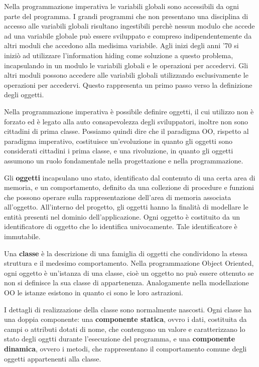 \documentclass[a4paper,18pt]{extarticle}
\begin{document}
Nella programmazione imperativa le variabili globali sono accessibili da ogni parte del programma. I grandi programmi che non presentano una disciplina di accesso alle variabili globali risultano ingestibili perchè nessun modulo che accede ad una variabile globale può essere sviluppato e compreso indipendentemente da altri moduli che accedono alla medisima variabile. Agli inizi degli anni '70 si iniziò ad utilizzare l'information hiding come soluzione a questo problema, incapsulando in un modulo le variabili globali e le operazioni per accedervi. Gli altri moduli possono accedere alle variabili globali utilizzando esclusivamente le operazioni per accedervi. Questo rappresenta un primo passo verso la definizione degli oggetti.

Nella programmazione imperativa è possibile definire oggetti, il cui utilizzo non è forzato ed è legato alla auto consapevolezza degli sviluppatori, inoltre non sono cittadini di prima classe. Possiamo quindi dire che il paradigma OO, rispetto al paradigma imperativo, costituisce un'evoluzione in quanto gli oggetti sono considerati cittadini i prima classe, e una rivoluzione, in quanto gli oggetti assumono un ruolo fondamentale nella progettazione e nella programmazione.

Gli \textbf{oggetti} incapsulano uno stato, identificato dal contenuto di una certa area di memoria, e un comportamento, definito da una collezione di procedure e funzioni che possono operare sulla rappresentazione dell'area di memoria associata all'oggetto. All'interno del progetto, gli oggetti hanno la finalità di modellare le entità presenti nel dominio dell'applicazione. Ogni oggetto è costituito da un identificatore di oggetto che lo identifica univocamente. Tale identificatore è immutabile.

Una \textbf{classe} è la descrizione di una famiglia di oggetti che condividono la stessa struttura e il medesimo comportamento. Nella programmazione Object Oriented, ogni oggetto è un'istanza di una classe, cioè un oggetto no può essere ottenuto se non si definisce la sua classe di appartenenza. Analogamente nella modellazione OO le istanze esistono in quanto ci sono le loro astrazioni.

I dettagli di realizzazione della classe sono normalmente nascosti. Ogni classe ha una doppia componente: una \textbf{componente statica}, ovvro i dati, costituita da campi o attributi dotati di nome, che contengono un valore e caratterizzano lo stato degli oggtti durante l'esecuzione del programma, e una \textbf{componente dinamica}, ovvero i metodi, che rappresentano il comportamento comune degli oggetti appartenenti alla classe.
\end{document}
